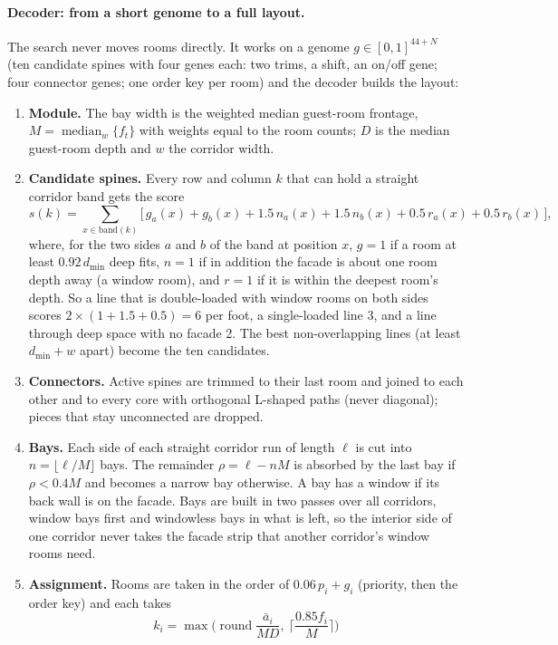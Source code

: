 \paragraph{Decoder: from a short genome to a full layout.} The search never moves rooms directly. It works on a genome
$g \in [0,1]^{44+N}$ (ten candidate spines with four genes each: two trims, a shift, an on/off gene; four connector genes;
one order key per room) and the decoder builds the layout:
\begin{enumerate}
\item \textbf{Module.} The bay width is the weighted median guest-room frontage,
$M = \operatorname{median}_w\{f_t\}$ with weights equal to the room counts; $D$ is the median guest-room depth and $w$ the
corridor width.
\item \textbf{Candidate spines.} Every row and column $k$ that can hold a straight corridor band gets the score
\[ s(k) = \sum_{x \in \text{band}(k)} \big[\, g_a(x) + g_b(x) + 1.5\,n_a(x) + 1.5\,n_b(x) + 0.5\,r_a(x) + 0.5\,r_b(x) \,\big], \]
where, for the two sides $a$ and $b$ of the band at position $x$, $g=1$ if a room at least $0.92\,d_{\min}$ deep fits,
$n=1$ if in addition the facade is about one room depth away (a window room), and $r=1$ if it is within the deepest room's
depth. So a line that is double-loaded with window rooms on both sides scores $2 \times (1 + 1.5 + 0.5) = 6$ per foot, a
single-loaded line 3, and a line through deep space with no facade 2. The best non-overlapping lines (at least $d_{\min}+w$
apart) become the ten candidates.
\item \textbf{Connectors.} Active spines are trimmed to their last room and joined to each other and to every core with
orthogonal L-shaped paths (never diagonal); pieces that stay unconnected are dropped.
\item \textbf{Bays.} Each side of each straight corridor run of length $\ell$ is cut into
$n = \lfloor \ell / M \rfloor$ bays. The remainder $\rho = \ell - nM$ is absorbed by the last bay if $\rho < 0.4M$ and becomes
a narrow bay otherwise. A bay has a window if its back wall is on the facade. Bays are built in two passes over all
corridors, window bays first and windowless bays in what is left, so the interior side of one corridor never takes
the facade strip that another corridor's window rooms need.
\item \textbf{Assignment.} Rooms are taken in the order of $0.06\,p_i + g_i$ (priority, then the order key) and each takes
\[ k_i = \max\!\Big(\operatorname{round}\frac{\bar a_i}{M D},\ \Big\lceil \frac{0.85 f_i}{M} \Big\rceil\Big) \]

\end{enumerate}
